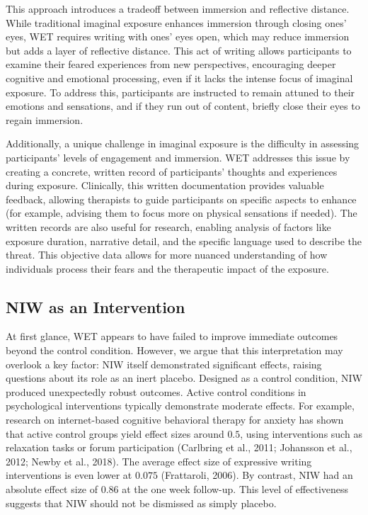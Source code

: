 \documentclass[
  man,floatsintext]{apa7}
\begin{document}
This approach introduces a tradeoff between immersion and reflective distance.
While traditional imaginal exposure enhances immersion through closing ones' eyes, WET requires writing with ones' eyes open, which may reduce immersion but adds a layer of reflective distance.
This act of writing allows participants to examine their feared experiences from new perspectives, encouraging deeper cognitive and emotional processing, even if it lacks the intense focus of imaginal exposure.
To address this, participants are instructed to remain attuned to their emotions and sensations, and if they run out of content, briefly close their eyes to regain immersion.

Additionally, a unique challenge in imaginal exposure is the difficulty in assessing participants' levels of engagement and immersion.
WET addresses this issue by creating a concrete, written record of participants' thoughts and experiences during exposure.
Clinically, this written documentation provides valuable feedback, allowing therapists to guide participants on specific aspects to enhance (for example, advising them to focus more on physical sensations if needed).
The written records are also useful for research, enabling analysis of factors like exposure duration, narrative detail, and the specific language used to describe the threat.
This objective data allows for more nuanced understanding of how individuals process their fears and the therapeutic impact of the exposure.

\subsection{NIW as an Intervention}\label{niw-as-an-intervention}

At first glance, WET appears to have failed to improve immediate outcomes beyond the control condition.
However, we argue that this interpretation may overlook a key factor: NIW itself demonstrated significant effects, raising questions about its role as an inert placebo.
Designed as a control condition, NIW produced unexpectedly robust outcomes.
Active control conditions in psychological interventions typically demonstrate moderate effects.
For example, research on internet-based cognitive behavioral therapy for anxiety has shown that active control groups yield effect sizes around \(0.5\), using interventions such as relaxation tasks or forum participation (Carlbring et al., 2011; Johansson et al., 2012; Newby et al., 2018).
The average effect size of expressive writing interventions is even lower at \(0.075\) (Frattaroli, 2006).
By contrast, NIW had an absolute effect size of \(0.86\) at the one week follow-up.
This level of effectiveness suggests that NIW should not be dismissed as simply placebo.
\end{document}
